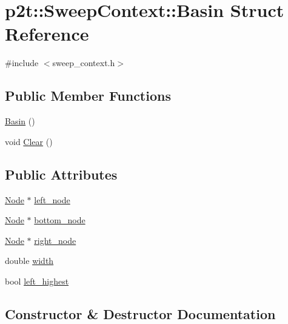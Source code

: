 \hypertarget{structp2t_1_1_sweep_context_1_1_basin}{}\section{p2t\+:\+:Sweep\+Context\+:\+:Basin Struct Reference}
\label{structp2t_1_1_sweep_context_1_1_basin}


{\ttfamily \#include $<$sweep\+\_\+context.\+h$>$}

\subsection*{Public Member Functions}
\begin{DoxyCompactItemize}
\item 
\hyperlink{structp2t_1_1_sweep_context_1_1_basin_a3ddad0230496796b6e27fd97775aa260}{Basin} ()
\item 
void \hyperlink{structp2t_1_1_sweep_context_1_1_basin_a212e9df729cb98f0089a4e54da19fc81}{Clear} ()
\end{DoxyCompactItemize}
\subsection*{Public Attributes}
\begin{DoxyCompactItemize}
\item 
\hyperlink{structp2t_1_1_node}{Node} $\ast$ \hyperlink{structp2t_1_1_sweep_context_1_1_basin_ac547533c638f5c459b036087b044cae6}{left\+\_\+node}
\item 
\hyperlink{structp2t_1_1_node}{Node} $\ast$ \hyperlink{structp2t_1_1_sweep_context_1_1_basin_ab5fe6e9f2d3b16b38e9303b9fae1d00f}{bottom\+\_\+node}
\item 
\hyperlink{structp2t_1_1_node}{Node} $\ast$ \hyperlink{structp2t_1_1_sweep_context_1_1_basin_a87f10edada0bf4a6c29cfb369c39bbb2}{right\+\_\+node}
\item 
double \hyperlink{structp2t_1_1_sweep_context_1_1_basin_af3a83853a71d90a5ad0e2db66f44911c}{width}
\item 
bool \hyperlink{structp2t_1_1_sweep_context_1_1_basin_a91a2cdcccb03f88b66ce7e86e3d9820f}{left\+\_\+highest}
\end{DoxyCompactItemize}


\subsection{Constructor \& Destructor Documentation}
\hypertarget{structp2t_1_1_sweep_context_1_1_basin_a3ddad0230496796b6e27fd97775aa260}{}
